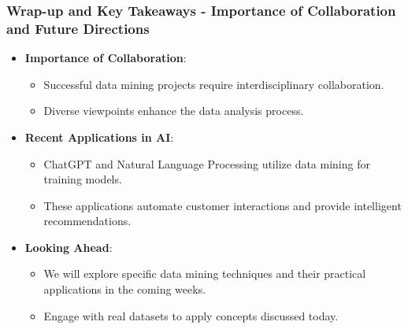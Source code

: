 \documentclass[aspectratio=169]{beamer}
\begin{document}
\begin{frame}[fragile]
    \frametitle{Wrap-up and Key Takeaways - Importance of Collaboration and Future Directions}
    \begin{itemize}
        \item \textbf{Importance of Collaboration}:
            \begin{itemize}
                \item Successful data mining projects require interdisciplinary collaboration.
                \item Diverse viewpoints enhance the data analysis process.
            \end{itemize}
        
        \item \textbf{Recent Applications in AI}:
            \begin{itemize}
                \item ChatGPT and Natural Language Processing utilize data mining for training models.
                \item These applications automate customer interactions and provide intelligent recommendations.
            \end{itemize}

        \item \textbf{Looking Ahead}:
            \begin{itemize}
                \item We will explore specific data mining techniques and their practical applications in the coming weeks.
                \item Engage with real datasets to apply concepts discussed today.
            \end{itemize}
    \end{itemize}
\end{frame}
\end{document}
